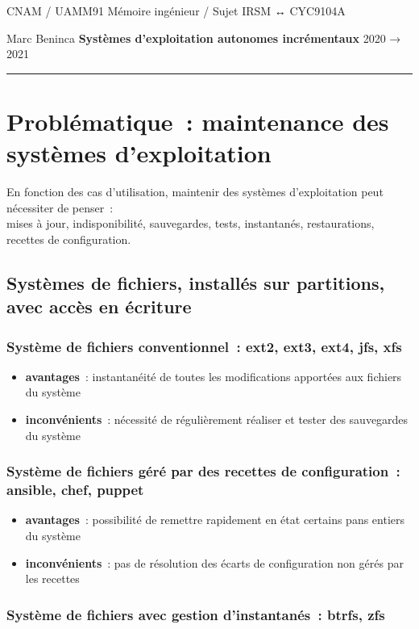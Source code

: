 \documentclass[10pt]{article}
\newcommand{\hr}{\rule{\textwidth}{1pt}}
\newenvironment{itmz}{\begin{itemize}
\setlength{\itemsep}{0em}
}{\end{itemize}}
\begin{document}
CNAM / UAMM91 \hfill Mémoire ingénieur / Sujet \hfill IRSM ↔ CYC9104A

Marc Beninca \hfill \textbf{Systèmes d’exploitation autonomes incrémentaux} \hfill 2020 → 2021

\hr

\section{Problématique : maintenance des systèmes d’exploitation}

En fonction des cas d’utilisation, maintenir des systèmes d’exploitation peut nécessiter de penser :\\
mises à jour, indisponibilité, sauvegardes, tests, instantanés, restaurations, recettes de configuration.

\subsection{Systèmes de fichiers, installés sur partitions, avec accès en écriture}

\subsubsection{Système de fichiers conventionnel : ext2, ext3, ext4, jfs, xfs}

\begin{itmz}
\item{\textbf{avantages} : instantanéité de toutes les modifications apportées aux fichiers du système}
\item{\textbf{inconvénients} : nécessité de régulièrement réaliser et tester des sauvegardes du système}
\end{itmz}

\subsubsection{Système de fichiers géré par des recettes de configuration : ansible, chef, puppet}

\begin{itmz}
\item{\textbf{avantages} : possibilité de remettre rapidement en état certains pans entiers du système}
\item{\textbf{inconvénients} : pas de résolution des écarts de configuration non gérés par les recettes}
\end{itmz}

\subsubsection{Système de fichiers avec gestion d’instantanés : btrfs, zfs}
\end{document}
